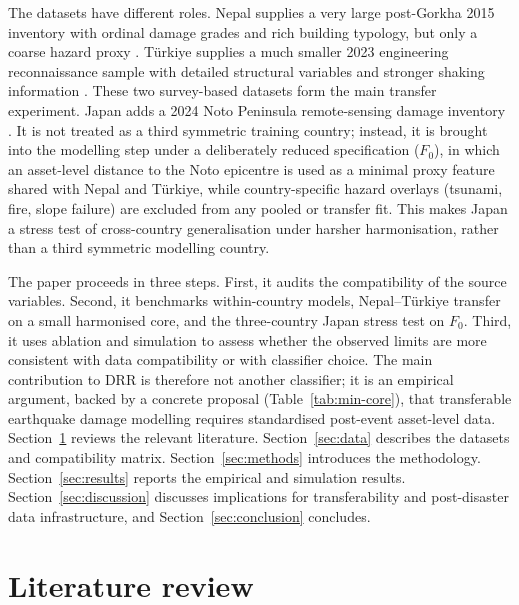 \documentclass[11pt,a4paper]{article}
\begin{document}
The datasets have different roles. Nepal supplies a very large post-Gorkha 2015 inventory with ordinal damage grades and rich building typology, but only a coarse hazard proxy \citep{ghimire2022nepal}. T\"urkiye supplies a much smaller 2023 engineering reconnaissance sample with detailed structural variables and stronger shaking information \citep{hariri2025turkiye}. These two survey-based datasets form the main transfer experiment. Japan adds a 2024 Noto Peninsula remote-sensing damage inventory \citep{vescovo2025noto}. It is not treated as a third symmetric training country; instead, it is brought into the modelling step under a deliberately reduced specification ($F_0$), in which an asset-level distance to the Noto epicentre is used as a minimal proxy feature shared with Nepal and T\"urkiye, while country-specific hazard overlays (tsunami, fire, slope failure) are excluded from any pooled or transfer fit. This makes Japan a stress test of cross-country generalisation under harsher harmonisation, rather than a third symmetric modelling country.

The paper proceeds in three steps. First, it audits the compatibility of the source variables. Second, it benchmarks within-country models, Nepal--T\"urkiye transfer on a small harmonised core, and the three-country Japan stress test on $F_0$. Third, it uses ablation and simulation to assess whether the observed limits are more consistent with data compatibility or with classifier choice. The main contribution to DRR is therefore not another classifier; it is an empirical argument, backed by a concrete proposal (Table~\ref{tab:min-core}), that transferable earthquake damage modelling requires standardised post-event asset-level data. Section~\ref{sec:litreview} reviews the relevant literature. Section~\ref{sec:data} describes the datasets and compatibility matrix. Section~\ref{sec:methods} introduces the methodology. Section~\ref{sec:results} reports the empirical and simulation results. Section~\ref{sec:discussion} discusses implications for transferability and post-disaster data infrastructure, and Section~\ref{sec:conclusion} concludes.

\section{Literature review}
\label{sec:litreview}
\end{document}
